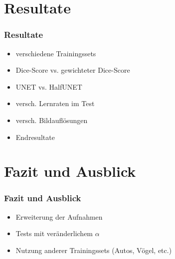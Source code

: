 \documentclass{beamer}
\begin{document}
\section{Resultate}
\begin{frame}
\frametitle{Resultate}
\begin{itemize}
    \item verschiedene Trainingssets
    \item Dice-Score vs. gewichteter Dice-Score
    \item UNET vs. HalfUNET
    \item versch. Lernraten im Test
    \item versch. Bildauflösungen
    \item Endresultate
\end{itemize}
\end{frame}

\section{Fazit und Ausblick}
\begin{frame}
\frametitle{Fazit und Ausblick}
\begin{itemize}
    \item Erweiterung der Aufnahmen
    \item Tests mit veränderlichem $\alpha$
    \item Nutzung anderer Trainingssets (Autos, Vögel, etc.)
\end{itemize}
\end{frame}
\end{document}
